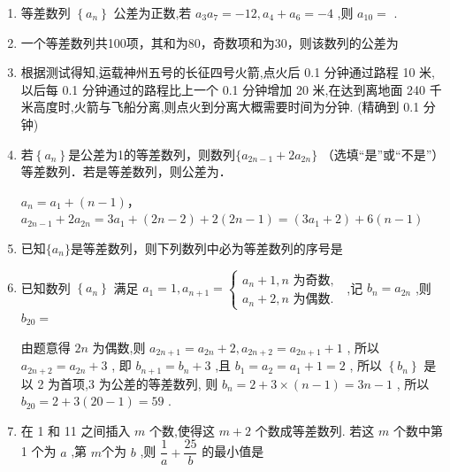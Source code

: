\begin{enumerate}
    
    \item 等差数列 $\left\{  {a}_{n}\right\}$ 公差为正数,若 $a_{3}a_7 =  -12, a_4 + a_6 =  - 4$ ,则 $a_{10} =$ .
    \item 一个等差数列共100项，其和为80，奇数项和为30，则该数列的公差为
    \item 根据测试得知,运载神州五号的长征四号火箭,点火后 0.1 分钟通过路程 10 米,以后每 0.1 分钟通过的路程比上一个 0.1 分钟增加 20 米,在达到离地面 240 千米高度时,火箭与飞船分离,则点火到分离大概需要时间为分钟. (精确到 0.1 分钟)
    \item 若$\left\{  {a}_{n}\right\}$是公差为1的等差数列，则数列$\{a_{2n-1}+2a_{2n}\}$  （选填“是”或“不是”）等差数列．若是等差数列，则公差为．
    \begin{jieda}
        $a_n = a_1 + (n-1)$，$a_{2n-1}+2a_{2n} = 3a_1 + (2n-2) + 2(2n-1) = (3a_1+2) + 6(n-1)$
    \end{jieda}
    \item 已知$\{a_n\}$是等差数列，则下列数列中必为等差数列的序号是
    \item 已知数列 $\left\{  {a}_{n}\right\}$ 满足 ${a}_{1} = 1,{a}_{n + 1} = \left\{  \begin{array}{l} {a}_{n} + 1,n\text{ 为奇数,} \\  {a}_{n} + 2,n\text{ 为偶数. } \end{array}\right.$ ,记 ${b}_{n} = {a}_{2n}$ ,则 ${b}_{20} =$ 
    \begin{jieda}
        由题意得 ${2n}$ 为偶数,则 ${a}_{{2n} + 1} = {a}_{2n} + 2,{a}_{{2n} + 2} = {a}_{{2n} + 1} + 1$ ,
        所以 ${a}_{{2n} + 2} = {a}_{2n} + 3$ ,
        即 ${b}_{n + 1} = {b}_{n} + 3$ ,且 ${b}_{1} = {a}_{2} = {a}_{1} + 1 = 2$ ,
        所以 $\left\{  {b}_{n}\right\}$ 是以 2 为首项,3 为公差的等差数列,
        则 ${b}_{n} = 2 + 3 \times  \left( {n - 1}\right)  = {3n} - 1$ ,
        所以 ${b}_{20} = 2 + 3\left( {{20} - 1}\right)  = {59}$ .
    \end{jieda}
    \item 在 1 和 11 之间插入 $m$ 个数,使得这 $m + 2$ 个数成等差数列. 若这 $m$ 个数中第 1 个为 $a$ ,第 $m$个为 $b$ ,则 $\dfrac{1}{a} + \dfrac{25}{b}$ 的最小值是

\end{enumerate}
